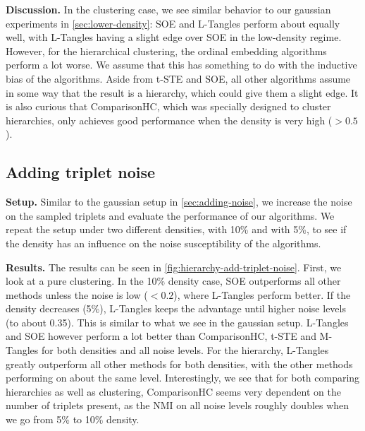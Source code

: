 \noindent
\textbf{Discussion.}
In the clustering case, we see similar behavior to our gaussian experiments in \autoref{sec:lower-density}: 
SOE and L-Tangles perform about equally well, with L-Tangles having a slight edge over SOE in the low-density regime. However, for the hierarchical clustering, the ordinal 
embedding algorithms perform a lot worse.  We assume that this has something to do with the inductive bias of the algorithms. Aside from t-STE and SOE, all other algorithms assume 
in some way that the result is a hierarchy, which could give
them a slight edge. It is also curious that ComparisonHC, which was specially designed to cluster hierarchies, only achieves good performance when the density is very high ($>0.5$).

\subsection{Adding triplet noise}\label{sec:h-triplet-noise}
\textbf{Setup.}
Similar to the gaussian setup in \autoref{sec:adding-noise}, we increase the noise on the sampled triplets and evaluate the performance of our algorithms. 
We repeat the setup under two different densities, with 10\% and with 5\%, to see if the density has an influence
on the noise susceptibility of the algorithms.

\noindent
\textbf{Results.}
The results can be seen in \autoref{fig:hierarchy-add-triplet-noise}. 
First, we look at a pure clustering. In the 10\% density case, SOE outperforms all other methods unless the noise is
low ($<0.2$), where L-Tangles perform better. If the density decreases (5\%), L-Tangles keeps the 
advantage until higher noise levels (to about 0.35). 
This is similar to what we see in the gaussian setup.
L-Tangles and SOE however perform a lot better than ComparisonHC, t-STE and M-Tangles for both densities and all noise levels.  
For the hierarchy, L-Tangles greatly outperform all other methods for both densities,
with the other methods performing on about the same level. Interestingly, 
we see that for both comparing hierarchies as well as clustering, 
ComparisonHC seems very dependent on the number of triplets present, as the NMI on all noise levels
roughly doubles when we go from 5\% to 10\% density.


